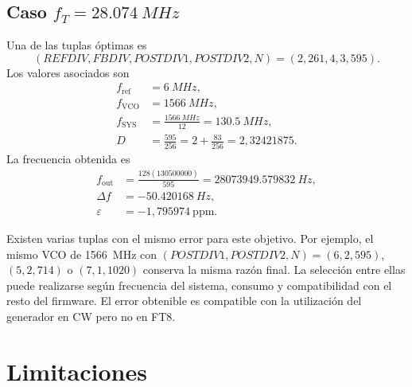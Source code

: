 \documentclass[11pt,a4paper]{article}
\begin{document}
\subsection{Caso \(f_T=\SI{28.074}{MHz}\)}

Una de las tuplas óptimas es
\begin{equation}
 \boxed{(REFDIV,FBDIV,POSTDIV1,POSTDIV2,N)=(2,261,4,3,595)}.
\end{equation}
Los valores asociados son
\begin{align}
 f_{\mathrm{ref}} &= \SI{6}{MHz},\\
 f_{\mathrm{VCO}} &= \SI{1566}{MHz},\\
 f_{\mathrm{SYS}} &= \frac{\SI{1566}{MHz}}{12}=\SI{130.5}{MHz},\\
 D &= \frac{595}{256}=2+\frac{83}{256}=2{,}32421875.
\end{align}
La frecuencia obtenida es
\begin{align}
 f_{\mathrm{out}} &= \frac{128(130500000)}{595}
 =\SI{28073949.579832}{Hz},\\
 \Delta f &= \boxed{-\SI{50.420168}{Hz}},\\
 \varepsilon &= \boxed{-1{,}795974\ \mathrm{ppm}}.
\end{align}

Existen varias tuplas con el mismo error para este objetivo. Por ejemplo, el
mismo VCO de \SI{1566}{MHz} con \((POSTDIV1,POSTDIV2,N)=(6,2,595)\),
\((5,2,714)\) o \((7,1,1020)\) conserva la misma razón final. La selección entre
ellas puede realizarse según frecuencia del sistema, consumo y compatibilidad
con el resto del firmware.
El error obtenible es compatible con la utilización del generador en CW pero no
en FT8.

\section{Limitaciones}
\end{document}
